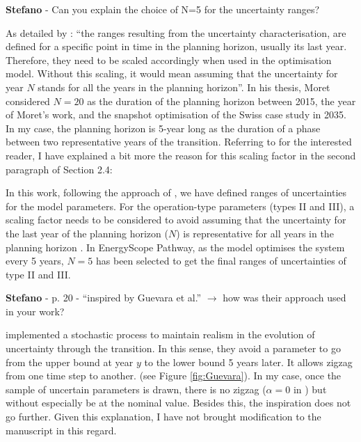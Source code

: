 \documentclass[12pt,a4paper]{article}
\begin{document}
\begin{mdframed}[style=comment] %
{\color{orange} \textbf{Stefano}} - Can you explain the choice of N=5 for the uncertainty ranges?
\end{mdframed}

\noindent As detailed by \citet{Moret2017PhDThesis}: ``the ranges resulting from the uncertainty characterisation, are defined for a specific point in time in the planning horizon, usually its last year. Therefore, they need to be scaled accordingly when used in the optimisation model. Without this scaling, it would mean assuming that the uncertainty for year $N$ stands for all the years in the planning horizon''. In his thesis, Moret considered $N=20$ as the duration of the planning horizon between 2015, the year of Moret's work, and the snapshot optimisation of the Swiss case study in 2035. In my case, the planning horizon is 5-year long as the duration of a phase between two representative years of the transition. Referring to \citet{Moret2017PhDThesis} for the interested reader, I have explained a bit more the reason for this scaling factor {\color{blue}in the second paragraph of Section 2.4}:

\begin{mdframed}[style=manuscript] %
In this work, following the approach of \citet{Moret2017PhDThesis}, we have defined ranges of uncertainties for the model parameters.  For the operation-type parameters (types II and III), a scaling factor needs to be considered to avoid assuming that the uncertainty for the last year of the planning horizon ($N$) is representative for all years in the planning horizon \citet{Moret2017PhDThesis}. In EnergyScope Pathway, as the model optimises the system every 5 years, $N=5$ has been selected to get the final ranges of uncertainties of type II and III. 
\end{mdframed}

\begin{mdframed}[style=comment] %
{\color{orange} \textbf{Stefano}} - p. 20 - ``inspired by Guevara et al.'' $\rightarrow$ how was their approach used in your work?
\end{mdframed}

\noindent \citet{guevara2022modeling} implemented a stochastic process to maintain realism in the evolution of uncertainty through the transition. In this sense, they avoid a parameter to go from the upper bound at year $y$ to the lower bound 5 years later. It allows zigzag from one time step to another. (see Figure \ref{fig:Guevara}). In my case, once the sample of uncertain parameters is drawn, there is no zigzag ($\alpha=0$ in \cite{guevara2022modeling}) but without especially be at the nominal value. Besides this, the inspiration does not go further. Given this explanation, I have not brought modification to the manuscript in this regard.
\end{document}
